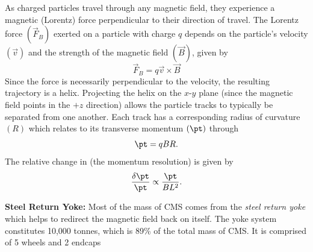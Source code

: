 As charged particles travel through any magnetic field, they experience a magnetic (Lorentz) force perpendicular to their direction of travel.
The Lorentz force $(\vec{F}_B)$ exerted on a particle with charge $q$ depends on the particle's velocity $(\vec{v})$ and the strength of the magnetic field $(\vec{B})$, given by
\begin{equation*}
    \vec{F}_B = q \vec{v} \times \vec{B}
\end{equation*}
Since the force is necessarily perpendicular to the velocity, the resulting trajectory is a helix.
Projecting the helix on the $x$-$y$ plane (since the magnetic field points in the $+z$ direction) allows the particle tracks to typically be separated from one another.
Each track has a corresponding radius of curvature $(R)$ which relates to its transverse momentum $(\pt)$ through
\begin{equation*}
    \pt = qBR.
\end{equation*}
The relative change in \pt (\ie the momentum resolution) is given by
\begin{equation}
    \frac{\delta \pt}{\pt} \propto \frac{\pt}{BL^2}.
\end{equation}

\textbf{Steel Return Yoke:} 
Most of the mass of CMS comes from the \emph{steel return yoke} which helps to redirect the magnetic field back on itself. 
The yoke system constitutes 10,000 tonnes, which is 89\% of the total mass of CMS.
It is comprised of 5 wheels and 2 endcaps
